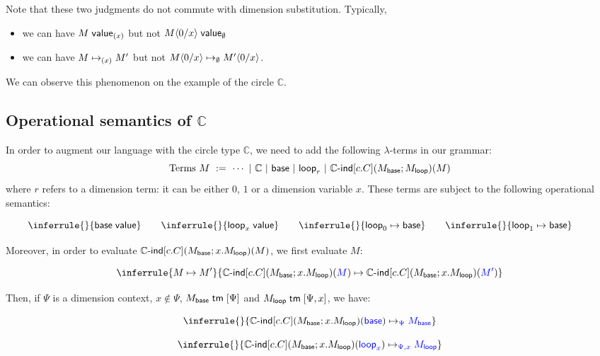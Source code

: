 \documentclass{article}
\newcommand\Circle{\mathbb{C}}
\newcommand\Base{\mathsf{base}}
\newcommand\Loop{\mathsf{loop}}
\newcommand\CIndOp{\Circle\textsf{-ind}}
\newcommand\CInd[4]{\CIndOp\Squares{#1}\Parens*{#2;#3}\Parens{#4}}
\newcommand\DimSubst[3]{#3\langle{#1}/{#2}\rangle}
\DeclarePairedDelimiter\Parens{\lparen}{\rparen}
\DeclarePairedDelimiter\Squares{[}{]}
\begin{document}
Note that these two judgments do not commute with dimension
substitution. Typically,
\begin{itemize}
\item we can have $\valueDim{M}{(x)}$ but not
  $\valueDim{\DimSubst{0}{x}{M}}{\EmptyDimCtx}$
\item we can have $\stepDim{M}{M'}{(x)}$ but not
  $\stepDim{\DimSubst{0}{x}{M}}{\DimSubst{0}{x}{M'}}{\EmptyDimCtx}$.
\end{itemize}
We can observe this phenomenon on the example of the circle $\Circle$.


\subsection{Operational semantics of $\Circle$}\label{sec:circle-sem}

In order to augment our language with the circle type $\Circle$, we
need to add the following $\lambda$-terms in our grammar:
\[ \text{Terms } M \ := \ \cdots \ | \ 
  \Circle \ | \ \Base \ | \ \Loop_r \ | \ \CInd{c.C}{M_{\Base}}{M_{\Loop}}{M} \]
where $r$ refers to a dimension term: it can be either $0$, $1$ or a dimension
variable $x$. These terms are subject to the following operational semantics:

\[
\inferrule{}{\valueJ{\Base}} \qquad
\inferrule{}{\valueJ{\Loop_x}} \qquad
\inferrule{}{\step{\Loop_0}{\Base}} \qquad
\inferrule{}{\step{\Loop_1}{\Base}} \qquad
\]

Moreover, in order to evaluate $\CInd{c.C}{M_{\Base}}{x.M_{\Loop}}{M}$, 
we first evaluate $M$:

\[ 
\inferrule{\step{M}{M'}}{
  \step{
    \CInd{c.C}{M_{\Base}}{x.M_{\Loop}}{\colored{M}}
  }{
    \CInd{c.C}{M_{\Base}}{x.M_{\Loop}}{\colored{M'}}
  }
}\]

\medskip

\noindent Then, if $\Psi$ is a dimension context, $x \notin \Psi$, 
$\isTm{M_{\Base}}{\Psi}$ and $\isTm{M_{\Loop}}{\Psi, x}$, we have:

\[
\inferrule{}{
  \stepDim{
    \CInd{c.C}{M_{\Base}}{x.M_{\Loop}}{\colored{\Base}}
  }{
    \colored{M_{\Base}}
  }{\colored{\Psi}}
}
\]


\[
\inferrule{}{
  \stepDim{
    \CInd{c.C}{M_{\Base}}{x.M_{\Loop}}{\colored{\Loop_x}}
  }{
    \colored{M_{\Loop}}
  }{\colored{\Psi, x}}
}
\]

\bigskip
\end{document}
